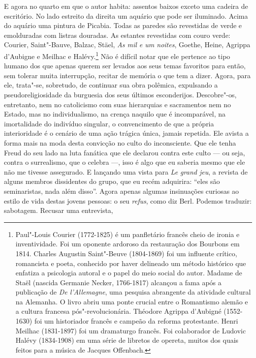 E agora no quarto em que o autor habita: assentos baixos exceto uma
cadeira de escritório. No lado estreito da direita um aquário que pode
ser iluminado. Acima do aquário uma pintura de Picabia. Todas as paredes
são revestidas de verde e emolduradas com listras douradas. As estantes
revestidas com couro verde: Courier, Saint"-Bauve, Balzac, Stäel,
\emph{As mil e um noites}, Goethe, Heine, Agrippa d'Aubigne e Meilhac e
Halévy.\footnote{Paul"-Louis Courier (1772-1825) é um panfletário
  francês cheio de ironia e inventividade. Foi um oponente ardoroso da
  restauração dos Bourbons em 1814. Charles Augustin Saint"-Beuve
  (1804-1869) foi um influente crítico, romancista e poeta, conhecido
  por haver delineado um método histórico que enfatiza a psicologia
  autoral e o papel do meio social do autor. Madame de Staël (nascida
  Germanie Necker, 1766-1817) alcançou a fama após a publicação de
  \emph{De l'Allemagne}, uma pesquisa abrangente da atividade cultural
  na Alemanha. O livro abriu uma ponte crucial entre o Romantismo alemão
  e a cultura francesa pós"-revolucionária. Théodore Agrippa d'Aubigné
  (1552-1630) foi um historiador francês e campeão da reforma
  protestante. Henri Meilhac (1831-1897) foi um dramaturgo francês. Foi
  colaborador de Ludovic Halévy (1834-1908) em uma série de libretos de
  opereta, muitos dos quais feitos para a música de Jacques Offenbach. \versal{[N. E.]}}
Não é difícil notar que ele pertence ao tipo humano dos que apenas
querem ser levados aos seus temas favoritos para então, sem tolerar
muita interrupção, recitar de memória o que tem a dizer. Agora, para
ele, trata"-se, sobretudo, de continuar sua obra polêmica, expulsando a
pseudoreligiosidade da burguesia dos seus últimos esconderijos.
Descobre"-os, entretanto, nem no catolicismo com suas hierarquias e
sacramentos nem no Estado, mas no individualismo, na crença naquilo que
é incomparável, na imortalidade do indivíduo singular, o convencimento
de que a própria interioridade é o cenário de uma ação trágica única,
jamais repetida. Ele avista a forma mais na moda desta convicção no
culto do inconsciente. Que ele tenha Freud do seu lado na luta fanática
que ele declarou contra este culto --- ou seja, contra o surrealismo, que
o celebra ---, isso é algo que eu saberia mesmo que ele não me tivesse
assegurado. E lançando uma vista para \emph{Le grand jeu}, a revista de
alguns membros dissidentes do grupo, que eu recém adquirira: ``eles são
seminaristas, nada além disso''. Agora apenas algumas insinuações
curiosas ao estilo de vida destas jovens pessoas: o seu \emph{refus},
como diz Berl. Podemos traduzir: sabotagem. Recusar uma entrevista,
